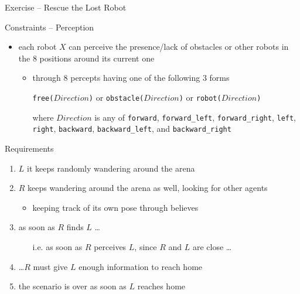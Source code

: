 \documentclass[presentation]{beamer}\mode<presentation>{\usetheme{AMSBolognaFC}}
\begin{document}
\begin{frame}[c, allowframebreaks]{Exercise \currentExercise{} -- Rescue the Lost Robot}
\begin{exampleblock}{Constraints -- Perception}
\begin{itemize}
            \item each robot $X$ can perceive the presence/lack of \alert{obstacles} or \alert{other robots} in the 8 positions around its current one
            \begin{itemize}
                \item through 8 percepts having one of the following 3 forms
                \begin{center}
                    \texttt{free($Direction$)} or \texttt{obstacle($Direction$)} or \texttt{robot($Direction$)}
                \end{center}
                where $Direction$ is any of \texttt{forward}, \texttt{forward\_left}, \texttt{forward\_right}, \texttt{left}, \texttt{right}, \texttt{backward}, \texttt{backward\_left}, and \texttt{backward\_right}
            \end{itemize}
        \end{itemize}
    \end{exampleblock}

    \begin{alertblock}{Requirements}
        \begin{enumerate}
            \item $L$ it keeps randomly wandering around the arena
            
            \item $R$ keeps wandering around the arena as well, looking for other agents
            \begin{itemize}
                \item keeping track of its own pose through believes
            \end{itemize}
            
            \item as soon as $R$ finds $L$ \ldots
            \begin{itemize}
                \item[i.e.] as soon as $R$ perceives $L$, since $R$ and $L$ are close \ldots
            \end{itemize}
        
            \item \ldots $R$ must give $L$ enough information to reach home
            
            \item the scenario is over as soon as $L$ reaches home
        \end{enumerate}
    \end{alertblock}
    
\end{frame} 
\end{document}
